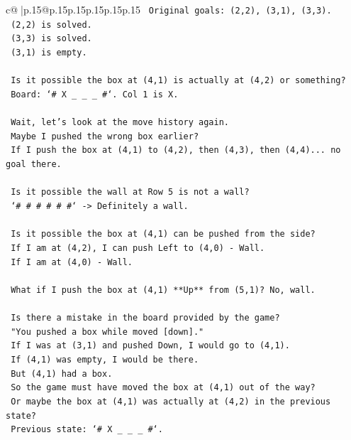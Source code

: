 \documentclass{article}
\begin{document}
{\begin{supertabular}{c@{$\;$}|p{.15\linewidth}@{}p{.15\linewidth}p{.15\linewidth}p{.15\linewidth}p{.15\linewidth}p{.15\linewidth}}
{{{\texttt{      Original goals: (2,2), (3,1), (3,3).} \\
\texttt{      (2,2) is solved.} \\
\texttt{      (3,3) is solved.} \\
\texttt{      (3,1) is empty.} \\
\\ 
\texttt{      Is it possible the box at (4,1) is actually at (4,2) or something?} \\
\texttt{      Board: `\# X \_ \_ \_ \#`. Col 1 is X.} \\
\\ 
\texttt{      Wait, let's look at the move history again.} \\
\texttt{      Maybe I pushed the wrong box earlier?} \\
\texttt{      If I push the box at (4,1) to (4,2), then (4,3), then (4,4)... no goal there.} \\
\\ 
\texttt{      Is it possible the wall at Row 5 is not a wall?} \\
\texttt{      `\# \# \# \# \# \#` {-}> Definitely a wall.} \\
\\ 
\texttt{      Is it possible the box at (4,1) can be pushed from the side?} \\
\texttt{      If I am at (4,2), I can push Left to (4,0) {-} Wall.} \\
\texttt{      If I am at (4,0) {-} Wall.} \\
\\ 
\texttt{      What if I push the box at (4,1) **Up** from (5,1)? No, wall.} \\
\\ 
\texttt{      Is there a mistake in the board provided by the game?} \\
\texttt{      "You pushed a box while moved {[}down{]}."} \\
\texttt{      If I was at (3,1) and pushed Down, I would go to (4,1).} \\
\texttt{      If (4,1) was empty, I would be there.} \\
\texttt{      But (4,1) had a box.} \\
\texttt{      So the game must have moved the box at (4,1) out of the way?} \\
\texttt{      Or maybe the box at (4,1) was actually at (4,2) in the previous state?} \\
\texttt{      Previous state: `\# X \_ \_ \_ \#`.} \\
}}}
\end{supertabular}}
\end{document}
